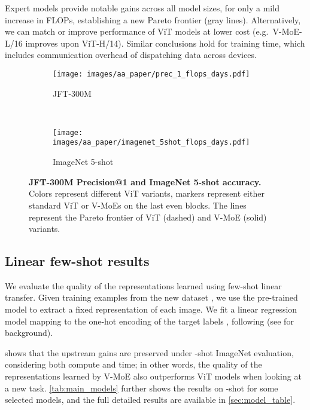 \documentclass{article}
\newcommand{\abbv}{{V-MoE}}
\begin{document}
Expert models provide notable gains across all model sizes, for only a mild increase in FLOPs, 
establishing a new Pareto frontier (gray lines). Alternatively, we can match or improve performance 
of ViT models at lower cost (e.g.\ \abbv{}-L/16 improves upon ViT-H/14).
Similar conclusions hold for training time, which includes communication overhead of dispatching data across devices.



\begin{figure}
\centering
\begin{subfigure}{.47\textwidth}
  \centering
  \texttt{[image: images/aa\_paper/prec\_1\_flops\_days.pdf]}
  \caption{JFT-300M}
  \label{im:upstream_vs_exaflops_and_days}
\end{subfigure}~~~
\begin{subfigure}{.47\textwidth}
  \centering
  \texttt{[image: images/aa\_paper/imagenet\_5shot\_flops\_days.pdf]}
  \caption{ImageNet 5-shot}
  \label{im:imagenet5shot_vs_exaflops_and_days}
\end{subfigure}
\caption{\textbf{JFT-300M Precision@1 and ImageNet 5-shot accuracy.}
Colors represent different ViT variants, markers represent either standard ViT or V-MoEs on the last  even blocks.
The lines represent the Pareto frontier of ViT (dashed) and V-MoE (solid) variants.
}
\label{im:performance_vs_exaflops_and_days}
\end{figure} 
\subsection{Linear few-shot results}
We evaluate the quality of the representations learned using few-shot linear transfer.
Given training examples from the new dataset , we use the pre-trained model  to extract a fixed representation  of each image. We fit a linear regression model mapping   to the one-hot encoding of the target labels , following \cite{dosovitskiy2020image} (see \cite[Chapter~5]{hastie2017elements} for background).

 shows that the upstream gains are preserved under -shot ImageNet evaluation,
considering both compute and time; in other words, the quality of the representations learned by \abbv{} also outperforms
ViT models when looking at a new task. \cref{tab:main_models} further shows the results on -shot for some selected models,
and the full detailed results are available in \cref{sec:model_table}.
\end{document}

